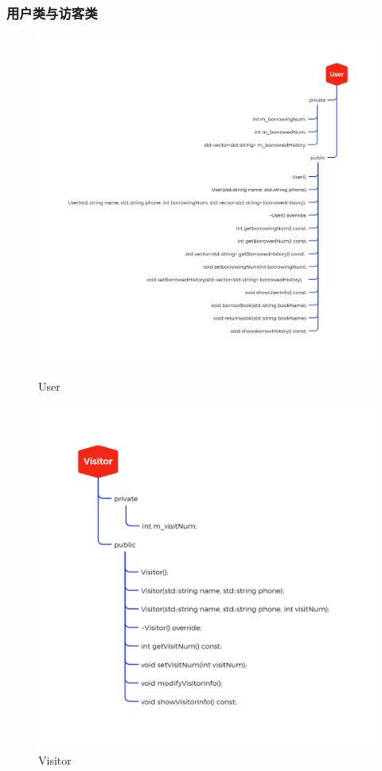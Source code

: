 \documentclass[12pt,twoside]{ctexart}
\begin{document}
\subsubsection{用户类与访客类}
\begin{figure}[H]
    \centering
    \begin{minipage}{0.45\textwidth}
        \centering
        \includegraphics[width=\textwidth]{Pic/LibraryManagement/User.png}
        \caption{User}
    \end{minipage}\hfill
    \begin{minipage}{0.45\textwidth}
        \centering
        \includegraphics[width=\textwidth]{Pic/LibraryManagement/Visitor.png}
        \caption{Visitor}
    \end{minipage}
\end{figure}
\end{document}
